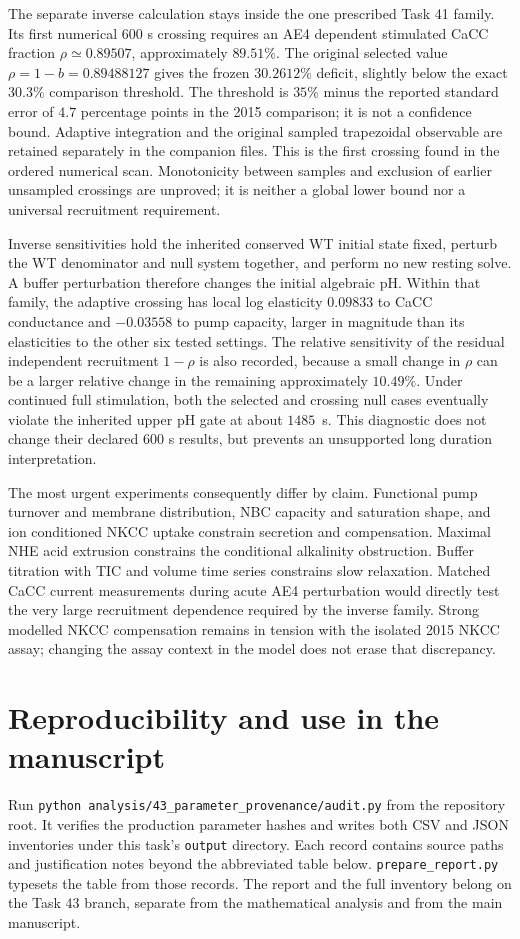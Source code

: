 \documentclass[11pt,a4paper]{article}
\begin{document}
The separate inverse calculation stays inside the one prescribed Task 41 family. Its first numerical 600 s crossing requires an AE4 dependent stimulated CaCC fraction $\rho\simeq0.89507$, approximately $89.51\%$. The original selected value $\rho=1-b=0.89488127$ gives the frozen $30.2612\%$ deficit, slightly below the exact $30.3\%$ comparison threshold. The threshold is $35\%$ minus the reported standard error of $4.7$ percentage points in the 2015 comparison; it is not a confidence bound. Adaptive integration and the original sampled trapezoidal observable are retained separately in the companion files. This is the first crossing found in the ordered numerical scan. Monotonicity between samples and exclusion of earlier unsampled crossings are unproved; it is neither a global lower bound nor a universal recruitment requirement.

Inverse sensitivities hold the inherited conserved WT initial state fixed, perturb the WT denominator and null system together, and perform no new resting solve. A buffer perturbation therefore changes the initial algebraic pH. Within that family, the adaptive crossing has local log elasticity $0.09833$ to CaCC conductance and $-0.03558$ to pump capacity, larger in magnitude than its elasticities to the other six tested settings. The relative sensitivity of the residual independent recruitment $1-\rho$ is also recorded, because a small change in $\rho$ can be a larger relative change in the remaining approximately $10.49\%$. Under continued full stimulation, both the selected and crossing null cases eventually violate the inherited upper pH gate at about $1485$~s. This diagnostic does not change their declared 600 s results, but prevents an unsupported long duration interpretation.

The most urgent experiments consequently differ by claim. Functional pump turnover and membrane distribution, NBC capacity and saturation shape, and ion conditioned NKCC uptake constrain secretion and compensation. Maximal NHE acid extrusion constrains the conditional alkalinity obstruction. Buffer titration with TIC and volume time series constrains slow relaxation. Matched CaCC current measurements during acute AE4 perturbation would directly test the very large recruitment dependence required by the inverse family. Strong modelled NKCC compensation remains in tension with the isolated 2015 NKCC assay; changing the assay context in the model does not erase that discrepancy.

\section{Reproducibility and use in the manuscript}
Run \texttt{python analysis/43\_parameter\_provenance/audit.py} from the repository root. It verifies the production parameter hashes and writes both CSV and JSON inventories under this task's \texttt{output} directory. Each record contains source paths and justification notes beyond the abbreviated table below. \texttt{prepare\_report.py} typesets the table from those records. The report and the full inventory belong on the Task 43 branch, separate from the mathematical analysis and from the main manuscript.
\end{document}
